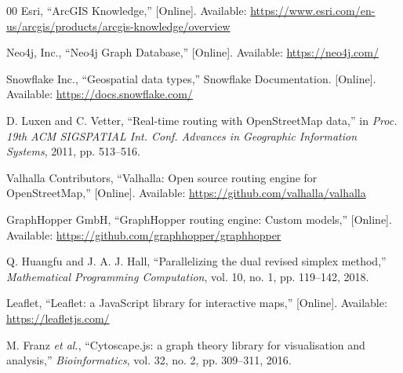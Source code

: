 \documentclass[conference]{IEEEtran}
\begin{document}
\begin{thebibliography}{00}
 Esri, ``ArcGIS Knowledge,'' [Online]. Available:
\url{https://www.esri.com/en-us/arcgis/products/arcgis-knowledge/overview}

 Neo4j, Inc., ``Neo4j Graph Database,'' [Online].
Available: \url{https://neo4j.com/}

 Snowflake Inc., ``Geospatial data types,''
Snowflake Documentation. [Online]. Available:
\url{https://docs.snowflake.com/}

 D. Luxen and C. Vetter, ``Real-time routing with
OpenStreetMap data,'' in \textit{Proc. 19th ACM SIGSPATIAL Int. Conf.
Advances in Geographic Information Systems}, 2011, pp. 513--516.

 Valhalla Contributors, ``Valhalla: Open source routing
engine for OpenStreetMap,'' [Online]. Available:
\url{https://github.com/valhalla/valhalla}

 GraphHopper GmbH, ``GraphHopper routing engine:
Custom models,'' [Online]. Available:
\url{https://github.com/graphhopper/graphhopper}

 Q. Huangfu and J. A. J. Hall, ``Parallelizing the dual
revised simplex method,'' \textit{Mathematical Programming Computation},
vol. 10, no. 1, pp. 119--142, 2018.

 Leaflet, ``Leaflet: a JavaScript library for
interactive maps,'' [Online]. Available: \url{https://leafletjs.com/}

 M. Franz \textit{et al.}, ``Cytoscape.js: a graph
theory library for visualisation and analysis,''
\textit{Bioinformatics}, vol. 32, no. 2, pp. 309--311, 2016.
\end{thebibliography}
\end{document}
